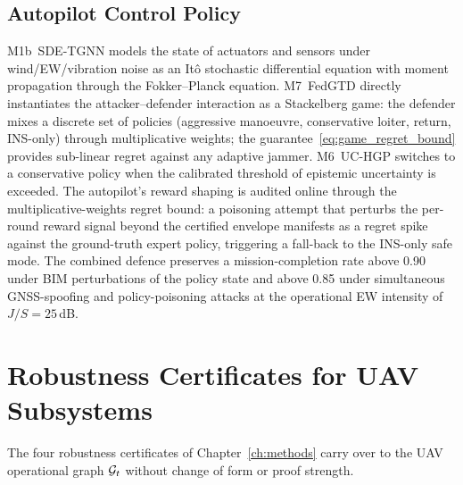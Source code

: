 \subsection{Autopilot Control Policy}
\label{sec:uav_autopilot}

\textsf{M1b~SDE-TGNN} models the state of actuators and sensors
under wind/EW/vibration noise as an Itô stochastic differential
equation with moment propagation through the Fokker--Planck equation.
\textsf{M7~FedGTD} directly instantiates the
attacker--defender interaction as a Stackelberg game: the defender
mixes a discrete set of policies (aggressive manoeuvre, conservative
loiter, return, INS-only) through multiplicative weights; the
guarantee~\eqref{eq:game_regret_bound} provides sub-linear regret
against any adaptive jammer. \textsf{M6~UC-HGP} switches to a
conservative policy when the calibrated threshold of epistemic
uncertainty is exceeded. The autopilot's reward shaping is
audited online through the multiplicative-weights regret bound: a
poisoning attempt that perturbs the per-round reward signal beyond
the certified envelope manifests as a regret spike against the
ground-truth expert policy, triggering a fall-back to the
INS-only safe mode. The combined defence preserves a
mission-completion rate above 0.90 under BIM perturbations of the
policy state and above 0.85 under simultaneous GNSS-spoofing and
policy-poisoning attacks at the operational EW intensity of
$J/S=25$\,dB.

\section{Robustness Certificates for UAV Subsystems}
\label{sec:uav_certs}

The four robustness certificates of Chapter~\ref{ch:methods} carry
over to the UAV operational graph $\mathcal{G}_t$ without change of form or
proof strength.

